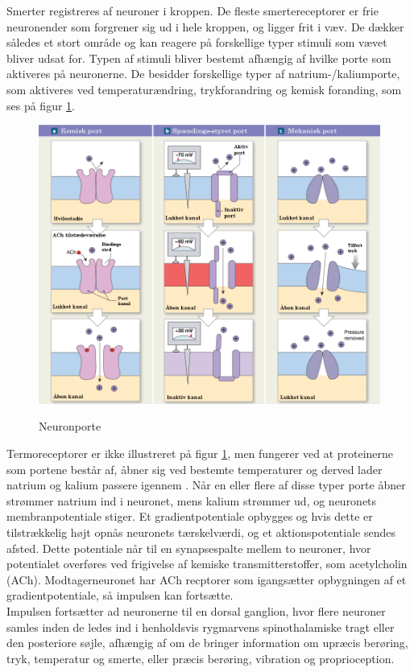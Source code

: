 Smerter registreres af neuroner i kroppen. De fleste smertereceptorer er frie neuronender som forgrener sig ud i hele kroppen, og ligger frit i væv. De dækker således et stort område og kan reagere på forskellige typer stimuli som vævet bliver udsat for. Typen af stimuli bliver bestemt afhængig af hvilke porte som aktiveres på neuronerne. De besidder forskellige typer af natrium-/kaliumporte, som aktiveres ved temperaturændring, trykforandring og kemisk foranding, som ses på figur \ref{neuronport}.

\begin{figure}[H]
	\caption{Neuronporte}
	\label{neuronport}
	\centering
	\includegraphics[scale=.8]{figures/neuronport}
	\flushleft
	\textit{\citep{Martini}}
\end{figure}

Termoreceptorer er ikke illustreret på figur \ref{neuronport}, men fungerer ved at proteinerne som portene består af, åbner sig ved bestemte temperaturer og derved lader natrium og kalium passere igennem \citep{kimball}. 
Når en eller flere af disse typer porte åbner strømmer natrium ind i neuronet, mens kalium strømmer ud, og neuronets membranpotentiale stiger. Et gradientpotentiale opbygges og hvis dette er tilstrækkelig højt opnås neuronets tærskelværdi, og et aktionspotentiale sendes afsted. Dette potentiale når til en synapsespalte mellem to neuroner, hvor potentialet overføres ved frigivelse af kemiske transmitterstoffer, som acetylcholin (ACh). Modtagerneuronet har ACh recptorer som igangsætter opbygningen af et gradientpotentiale, så impulsen kan fortsætte. \\
Impulsen fortsætter ad neuronerne til en dorsal ganglion, hvor flere neuroner samles inden de ledes ind i henholdsvis rygmarvens spinothalamiske tragt eller den posteriore søjle, afhængig af om de bringer information om upræcis berøring, tryk, temperatur og smerte, eller præcis berøring, vibration og proprioception. \citep{Martini}

